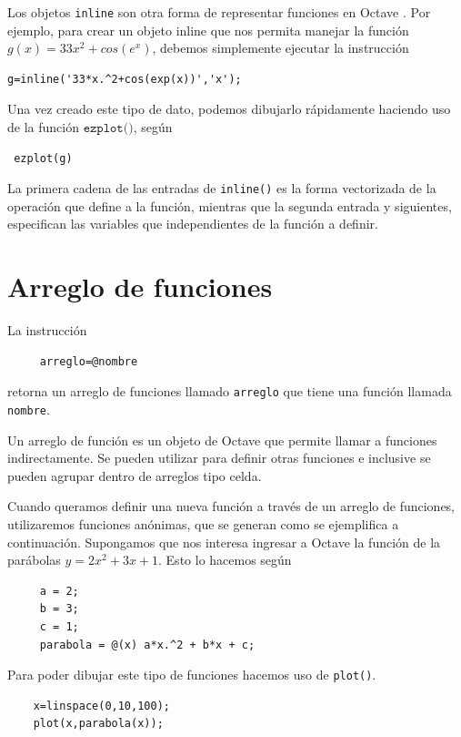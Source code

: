 \documentclass[letter,11pt]{article}
\newcommand\0{\mathbf{0}}
\newcommand{\octave}{{\sc Octave }}
\begin{document}
Los objetos \texttt{inline} son otra forma de representar funciones en \octave. Por ejemplo, para 
crear un objeto inline que nos permita manejar la funci\'on $g(x)=33x^2+cos(e^x)$, debemos simplemente 
ejecutar la instrucci\'on
\begin{lstlisting}
g=inline('33*x.^2+cos(exp(x))','x');
\end{lstlisting}
Una vez creado este tipo de dato, podemos dibujarlo r\'apidamente haciendo uso de la funci\'on $\texttt{ezplot()}$, 
seg\'un
\begin{lstlisting}
 ezplot(g)
\end{lstlisting}
La primera cadena de las entradas de \texttt{inline()} es la forma vectorizada de la operaci\'on 
que define a la funci\'on, mientras que la segunda entrada y siguientes, especifican las variables 
que independientes de la funci\'on a definir.

\section{Arreglo de funciones}
  La instrucci\'on 
    \begin{lstlisting}
     arreglo=@nombre
    \end{lstlisting}
    retorna  un arreglo de funciones llamado \texttt{arreglo} que tiene 
    una funci\'on llamada \texttt{nombre}.
    
    Un arreglo de funci\'on es un objeto de \octave que permite llamar a funciones indirectamente. Se pueden utilizar para definir otras funciones e inclusive se pueden agrupar dentro de arreglos tipo celda.

    Cuando queramos definir una nueva funci\'on a trav\'es de un arreglo de funciones, utilizaremos funciones an\'onimas, que se generan como se ejemplifica a continuaci\'on. Supongamos que nos interesa ingresar a \octave la funci\'on de la par\'abolas $y=2x^2+3x+1$. Esto lo hacemos seg\'un
    \begin{lstlisting}
     a = 2;
     b = 3;
     c = 1;
     parabola = @(x) a*x.^2 + b*x + c;
    \end{lstlisting}
    Para poder dibujar este tipo de funciones hacemos uso de \texttt{plot()}.
    \begin{lstlisting}
    x=linspace(0,10,100);
    plot(x,parabola(x));
    \end{lstlisting}
    
\end{document}

